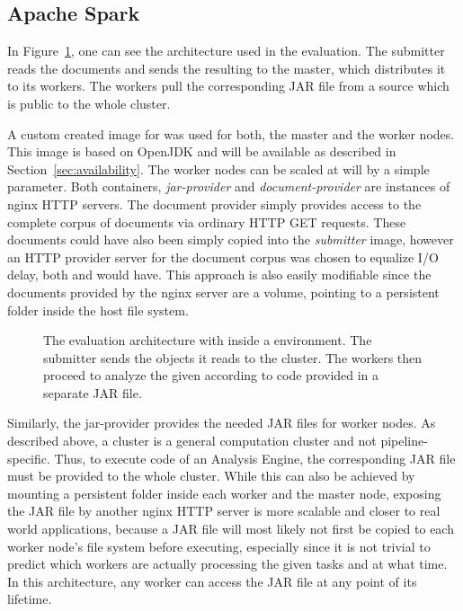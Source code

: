 \subsection{Apache Spark}
\label{ssec:spark}
In Figure~\ref{fig:arch-spark}, one can see the \docker{} architecture used in the evaluation. The submitter reads the documents and sends the resulting \cas{} to the \spark{} master, which distributes it to its workers. The workers pull the corresponding JAR file from a source which is public to the whole cluster.

 A custom created \docker{} image for \spark{} was used for both, the master and the worker nodes. This image is based on OpenJDK and will be available as described in Section~\ref{sec:availability}. The \spark{} worker nodes can be scaled at will by a simple \docker{} parameter. Both containers, \emph{jar-provider} and \emph{document-provider} are  instances of nginx HTTP servers. The document provider simply provides access to the complete corpus of documents via ordinary HTTP GET requests. These documents could have also been simply copied into the \emph{submitter} image, however an HTTP provider server for the document corpus was chosen to equalize I/O delay, both \uimaas{} and \spark{} would have. This approach is also easily modifiable since the documents provided by the nginx server are a volume, pointing to a persistent folder inside the host file system.
\begin{figure}[tbh]
	\centering
	
	\caption[The evaluation architecture with Spark inside a Docker environment.]{The evaluation architecture with \spark{} inside a \docker{} environment. The submitter sends the \cas{} objects it reads to the \spark{} cluster. The workers then proceed to analyze the given \cas{} according to code provided in a separate JAR file.}
	\label{fig:arch-spark}
\end{figure}
Similarly, the jar-provider provides the needed JAR files for \spark{} worker nodes. As described above, a \spark{} cluster is a general computation cluster and not pipeline-specific. Thus, to execute code of an Analysis Engine, the corresponding JAR file must be provided to the whole cluster. While this can also be achieved by mounting a persistent folder inside each worker and the master node, exposing the JAR file by another nginx HTTP server is more scalable and closer to real world applications, because a JAR file will most likely not first be copied to each worker node's file system before executing, especially since it is not trivial to predict which workers are actually processing the given tasks and at what time. In this architecture, any worker can access the JAR file at any point of its lifetime.

